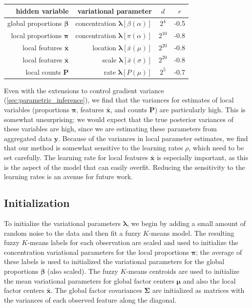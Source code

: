 \documentclass[twoside,11pt]{article}
\begin{document}
\begin{center}
\begin{tabular}{rrcc}
    \toprule
    \textbf{hidden variable} & \textbf{variational parameter} & $d$ & $r$\\
    \midrule
    global proportions $\boldsymbol{\beta}$ & 
        concentration $\boldsymbol{\lambda}[\beta(\alpha)]$& $2^4$ & -0.5 \\
    local proportions $\boldsymbol{\pi}$ & 
        concentration $\boldsymbol{\lambda}[\pi(\alpha)]$ & $2^{10}$ & -0.8 \\
    local features $\boldsymbol{\bar{x}}$ & 
        location $\boldsymbol{\lambda}[\bar{x}(\mu)]$ & $2^{20}$ & -0.8 \\
    local features $\boldsymbol{\bar{x}}$ &
        scale $\boldsymbol{\lambda}[\bar{x}(\sigma)]$ & $2^{20}$ & -0.8\\
    local counts $\boldsymbol{P}$ &
        rate $\boldsymbol{\lambda}[P(\mu)]$ & $2^5$ & -0.7\\
    \bottomrule
\end{tabular}
\end{center}

Even with the extensions to control gradient variance (\cref{sec:parametric_inference}), we find that the variances for estimates of local variables (proportions $\boldsymbol{\pi}$, features $\boldsymbol{\bar{x}}$, and counts $\boldsymbol{P}$) are particularly high.  This is somewhat unsurprising: we would expect that the true posterior variances of these variables are high, since we are estimating these parameters from aggregated data $\boldsymbol{y}$.
Because of the variances in local parameter estimates, we find that our method is somewhat sensitive to the learning rates $\rho$, which need to be set carefully.  The learning rate for local features $\boldsymbol{\bar{x}}$ is especially important, as this is the aspect of the model that can easily overfit.  Reducing the sensitivity to the learning rates is an avenue for future work.

\subsection{Initialization}
\label{app:initialize}
To initialize the variational parameters $\boldsymbol{\lambda}$, we begin by adding a small amount of random noise to the data and then fit a fuzzy $K$-means model.  The resulting fuzzy $K$-means labels for each observation are scaled and used to initialize the concentration variational parameters for the local proportions $\boldsymbol{\pi}$; the average of these labels is used to initialized the variational parameters for the global proportions $\boldsymbol{\beta}$ (also scaled).  The fuzzy $K$-means centroids are used to initialize the mean variational parameters for global factor centers $\boldsymbol{\mu}$ and also the local factor centers $\bar{\boldsymbol{x}}$.   The global factor covariances $\boldsymbol{\Sigma}$ are initialized as matrices with the variances of each observed feature along the diagonal.
\end{document}
